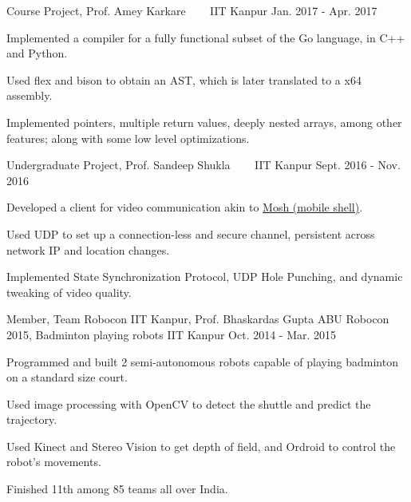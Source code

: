 \begin{cventries}
  \cventry
  {Course Project, Prof. Amey Karkare}
  {\href{https://github.com/pallavagarwal07/amigo.git}{}
    \ \ \ \normalfont\href{https://github.com/pallavagarwal07/amigo}
    {}}
  {IIT Kanpur}
  {Jan. 2017 - Apr. 2017}
  {
    \begin{cvitems}
    \item Implemented a compiler for a fully functional subset of the Go language, in C++ and Python.
    \item Used flex and bison to obtain an AST, which is later translated to a x64 assembly.
    \item Implemented pointers, multiple return values, deeply nested arrays, among other features; along with some low level optimizations.
    \end{cvitems}
  }

  \cventry
  {Undergraduate Project, Prof. Sandeep Shukla}
  {\href{https://github.com/netsecIITK/moVi}{}
    \ \ \ \normalfont\href{https://github.com/netsecIITK/moVi}
    {}}
  {IIT Kanpur}
  {Sept. 2016 - Nov. 2016}
  {
    \begin{cvitems}
    \item Developed a client for video communication
      akin to \href{https://mosh.org/}{Mosh (mobile shell)}.
    \item Used UDP to set up a connection-less and secure channel,
      persistent across network IP and location changes.
    \item Implemented State Synchronization Protocol, UDP Hole
      Punching, and dynamic tweaking of video quality.
    \end{cvitems}
  }

  \cventry
  {Member, Team Robocon IIT Kanpur, Prof. Bhaskardas Gupta}
  {ABU Robocon 2015, Badminton playing robots}
  {IIT Kanpur}
  {Oct. 2014 - Mar. 2015}
  {
    \begin{cvitems}
    \item Programmed and built 2 semi-autonomous robots
      capable of playing badminton on a standard size court.
    \item Used image processing with OpenCV to detect the shuttle
      and predict the trajectory.
    \item Used Kinect and Stereo Vision to get depth of
      field, and Ordroid to control the robot's movements.
    \item Finished 11th among 85 teams all over India.
    \end{cvitems}
  }

\end{cventries}

